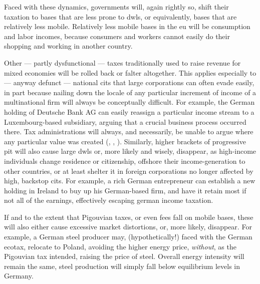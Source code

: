 Faced with these dynamics, governments will, again rightly so, shift their taxation to bases that are less prone to \glspl{dwl}, or equivalently, bases that are relatively less mobile.
Relatively less mobile bases in the \gls{eu} will be consumption and labor incomes, because consumers and workers cannot easily do their shopping and working in another country.

Other --- partly dysfunctional --- taxes traditionally used to raise revenue for mixed economies will be rolled back or falter altogether.
This applies especially to --- anyway defunct --- national \glspl{cit} that large corporations can often evade easily, in part because nailing down the locale of any particular increment of income of a multinational firm will always be conceptually difficult.
For example, the German holding of Deutsche Bank AG can easily reassign a particular income stream to a Luxembourg-based subsidiary, arguing that a crucial business process occurred there.
Tax administrations will always, and necessarily, be unable to argue where any particular value was created (\citealt{Ganghof2006}, \citealt{Ganghof}, \citealt[5]{Ganghof2007}).
Similarly, higher brackets of progressive \gls{pit} will also cause large \glspl{dwl} or, more likely and wisely, disappear, as high-income individuals change residence or citizenship, offshore their income-generation to other countries, or at least shelter it in foreign corporations no longer affected by high, backstop \glspl{cit}.
For example, a rich German entrepreneur can establish a new holding in Ireland to buy up his German-based firm, and have it retain most if not all of the earnings, effectively escaping german income taxation.

If and to the extent that Pigouvian taxes, or even fees fall on mobile bases, these will also either cause excessive market distortions, or, more likely, disappear.
For example, a German steel producer may, (hypothetically!) faced with the German ecotax, relocate to Poland, avoiding the higher energy price, \emph{without}, as the Pigouvian tax intended, raising the price of steel.
Overall energy intensity will remain the same, steel production will simply fall below equilibrium levels in Germany.

